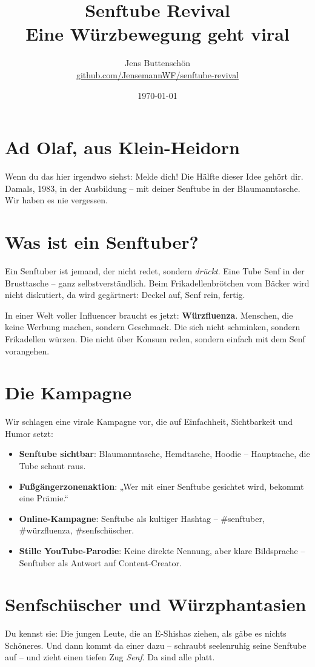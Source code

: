 \documentclass[12pt]{article}
\title{\Huge \textbf{Senftube Revival}\\[1ex]
\large Eine Würzbewegung geht viral}
\author{\large Jens Buttenschön\\
\href{https://github.com/JensemannWF/senftube-revival}{github.com/JensemannWF/senftube-revival}}
\date{\small \today}
\begin{document}
\maketitle

\section*{Ad Olaf, aus Klein-Heidorn}
Wenn du das hier irgendwo siehst: Melde dich! Die Hälfte dieser Idee gehört dir. Damals, 1983, in der Ausbildung – mit deiner Senftube in der Blaumanntasche. Wir haben es nie vergessen.

\section*{Was ist ein Senftuber?}
Ein Senftuber ist jemand, der nicht redet, sondern \emph{drückt}. Eine Tube Senf in der Brusttasche – ganz selbstverständlich. Beim Frikadellenbrötchen vom Bäcker wird nicht diskutiert, da wird gegärtnert: Deckel auf, Senf rein, fertig.

In einer Welt voller Influencer braucht es jetzt: \textbf{Würzfluenza}. Menschen, die keine Werbung machen, sondern Geschmack. Die sich nicht schminken, sondern Frikadellen würzen. Die nicht über Konsum reden, sondern einfach mit dem Senf vorangehen.

\section*{Die Kampagne}
Wir schlagen eine virale Kampagne vor, die auf Einfachheit, Sichtbarkeit und Humor setzt:

\begin{itemize}
  \item \textbf{Senftube sichtbar}: Blaumanntasche, Hemdtasche, Hoodie – Hauptsache, die Tube schaut raus.
  \item \textbf{Fußgängerzonenaktion}: „Wer mit einer Senftube gesichtet wird, bekommt eine Prämie.“
  \item \textbf{Online-Kampagne}: Senftube als kultiger Hashtag – \#senftuber, \#würzfluenza, \#senfschüscher.
  \item \textbf{Stille YouTube-Parodie}: Keine direkte Nennung, aber klare Bildsprache – Senftuber als Antwort auf Content-Creator.
\end{itemize}

\section*{Senfschüscher und Würzphantasien}
Du kennst sie: Die jungen Leute, die an E-Shishas ziehen, als gäbe es nichts Schöneres. Und dann kommt da einer dazu – schraubt seelenruhig seine Senftube auf – und zieht einen tiefen Zug \emph{Senf}. Da sind alle platt.
\end{document}
